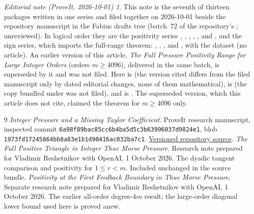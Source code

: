\documentclass[11pt,a4paper]{article}
\theoremstyle{remark}\newtheorem*{ednote}{Editorial note (ProveIt, 2026-10-01)}
\begin{document}
\begin{ednote}
This note is the seventh of thirteen packages written in one series and filed together on 2026-10-01 beside the repository manuscript  in the Fabius drafts tree (batch~72 of the repository's ; unreviewed). In logical order they are the positivity series , , , , ,  and , and the sign series, which imports the full-range theorem: , , ,  and , with the dataset  (no article). An earlier version of this article, \emph{The Full Pressure Positivity Range for Large Integer Orders} (orders $m\ge4096$), delivered in the same batch, is superseded by it and was not filed.
Here \cite{integer} is  (the version cited differs from the filed manuscript only by dated editorial changes, none of them mathematical), \cite{triangle} is
 (the copy bundled under  was not filed), and
\cite{boundary} is . The superseded version, which this article
does not cite, claimed the theorem for $m\ge4096$ only.
\end{ednote}
\begin{thebibliography}{9}\small
{}\emph{Integer Pressure and a Missing Taylor Coefficient}. ProveIt research manuscript, inspected commit \nolinkurl{6a98f89bac85cc6b4ba5d5c3b63996037d9824e1}, blob \nolinkurl{1973fd17245864bb8a83e1b1d90416ac032ba7c1}.\newline
\href{https://github.com/VladimirReshetnikov/ProveIt/blob/6a98f89bac85cc6b4ba5d5c3b63996037d9824e1/Analysis/FabiusFunction/docs/semi-formalized-research-frontiers/drafts/thue-morse/Thue_Morse_Integer_Pressure/article.tex}{Versioned repository source}.
\emph{The Full Positive Triangle in Integer Thue Morse Pressure}. Research note prepared for Vladimir Reshetnikov with OpenAI, 1 October 2026. The dyadic tangent comparison and positivity for $1\le r<m$. Included unchanged in the source bundle.
\emph{Positivity at the First Feedback Boundary in Thue Morse Pressure}. Separate research note prepared for Vladimir Reshetnikov with OpenAI, 1 October 2026. The earlier all-order degree-$4m$ result; the large-order diagonal lower bound used here is proved anew.
\end{thebibliography}
\end{document}
